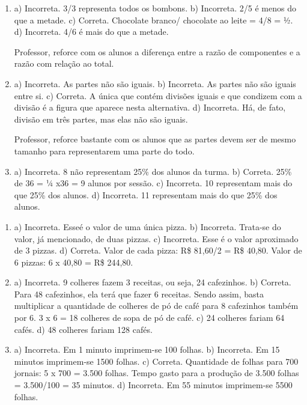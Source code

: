 
\begin{enumerate}
\item
a) Incorreta. 3/3 representa todos os bombons.
b) Incorreta. 2/5 é menos do que a metade.
c) Correta. Chocolate branco/ chocolate ao leite = 4/8 = ½.
d) Incorreta. 4/6 é mais do que a metade.

Professor, reforce com os alunos a diferença entre a razão de componentes e a razão com relação ao total.

\item
a) Incorreta. As partes não são iguais.
b) Incorreta. As partes não são iguais entre si.
c) Correta. A única que contém divisões iguais e que condizem com a divisão é a figura que aparece nesta alternativa.
d) Incorreta. Há, de fato, divisão em três partes, mas elas não são iguais.

Professor, reforce bastante com os alunos que as partes devem ser de
mesmo tamanho para representarem uma parte do todo.

\item
a) Incorreta. 8 não representam 25\% dos alunos da turma.
b) Correta. 25\% de 36 = ¼ x36 = 9 alunos por sessão.
c) Incorreta. 10 representam mais do que 25\% dos alunos.
d) Incorreta. 11 representam mais do que 25\% dos alunos.
\end{enumerate}


\begin{enumerate}
\item
a) Incorreta. Esseé o valor de uma única pizza.
b) Incorreta. Trata-se do valor, já mencionado, de duas pizzas.
c) Incorreta. Esse é o valor aproximado de 3 pizzas.
d) Correta. Valor de cada pizza: R\$ 81,60/2 = R\$ 40,80. Valor de 6 pizzas: 6 x 40,80 = R\$ 244,80.

\item
a) Incorreta. 9 colheres fazem 3 receitas, ou seja, 24 cafezinhos.
b) Correta. Para 48 cafezinhos, ela terá que fazer 6 receitas. Sendo assim, basta multiplicar a quantidade de colheres de pó de café para 8 cafezinhos também por
6. 3 x 6 = 18 colheres de sopa de pó de café.
c) 24 colheres fariam 64 cafés.
d) 48 colheres fariam 128 cafés.

\item
a) Incorreta. Em 1 minuto imprimem-se 100 folhas.
b) Incorreta. Em 15 minutos imprimem-se 1500 folhas.
c) Correta. Quantidade de folhas para 700 jornais: 5 x 700 = 3.500 folhas. Tempo gasto para a produção de 3.500 folhas = 3.500/100 = 35 minutos.
d) Incorreta. Em 55 minutos imprimem-se 5500 folhas.
\end{enumerate}

